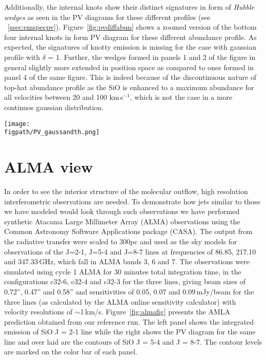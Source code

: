 \documentclass[useAMS,usenatbib]{mn2e}
\newcommand{\figpath}{PFIGS/}
\begin{document}
Additionally, the internal knots show their distinct signatures in
form of {\em Hubble wedges} as seen in the PV diagrams for these
different profiles (see
~\ref{ssec:emspecpv}). Figure~\ref{fig:pvdiffabun} shows a zoomed
version of the bottom four internal knots in form PV diagram for these
different abundance profile. As expected, the signatures of knotty
emission is missing for the case with gaussian profile with $\delta$ =
1. Further, the wedges formed in panels 1 and 2 of the figure in
general slightly more extended in position space as compared to ones
formed in panel 4 of the same figure. This is indeed because of the
discontinuous nature of top-hat abundance profile as the SiO is
enhanced to a maximum abundance for all velocities between 20 and 100
km\,s$^{-1}$, which is not the case in a more continuos gaussian
distribution.

\begin{figure*}
 \texttt{[image: \\figpath/PV\_gaussandth.png]}
 \caption{Contour maps of position-velocity diagram for the internal
   knots for 2-$>$1 SiO emission for runs with molecular
   cooling having $\eta$ = 3 and $\beta$ = 10 and different abundance
   profiles. The contours mark different levels of emission in Kelvins, viz.,
   0.2,0.6,1.0,1.4,1.8,2.0,3.0,4.0.}
\label{fig:pvdiffabun}
\end{figure*}
   
 
\section{ALMA view}
\label{sec:ALMAview}
%
In order to see the interior structure of the molecular outflow, high
resolution interferometric observations are needed. To demonstrate how
jets similar to those we have modeled would look through such
observations we have performed synthetic Atacama Large Millimeter
Array (ALMA) observations using the Common Astronomy Software
Applications package (CASA). The output from the radiative transfer
were scaled to 300pc and used as the sky models for observations of
the J=2-1, J=5-4 and J=8-7 lines at frequencies of 86.85, 217.10 and
347.33$\,$GHz, which fall in ALMA bands 3, 6 and 7. The observations
were simulated using cycle 1 ALMA for 30 minutes total integration
time, in the configurations c32-6, c32-4 and c32-3 for the three
lines, giving beam sizes of 0.72'', 0.47'' and 0.58'' and
sensitivities of 0.05, 0.07 and 0.09$\,$mJy/beam for the three lines
(as calculated by the ALMA online sensitivity calculator) with
velocity resolutions of $\sim$1$\,$km/s.
 Figure~\ref{fig:almafig}
presents the AMLA prediction obtained from our reference run. The
left panel shows the integrated emission of SiO J = 2-1 line while the right
shows the PV diagram for the same line and over laid are
the contours of SiO J = 5-4 and J = 8-7. The contour levels are marked
on the color bar of each panel. 
\end{document}
